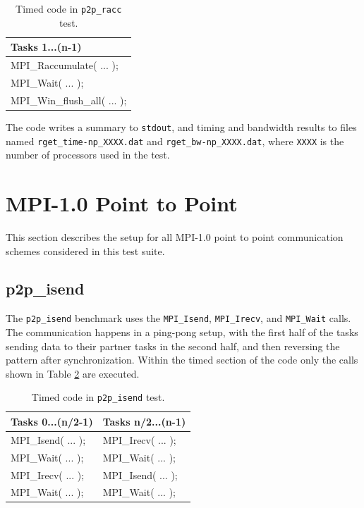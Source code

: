 \documentclass[10pt,a4paper]{report}
\begin{document}
\begin{table}[ht]
\centering
\caption{Timed code in \texttt{p2p\_racc} test.}
\label{tab:racc}
\begin{tabular}{|l|}
\hline
\bf{Tasks 1...(n-1)}	   \\\hline
MPI\_Raccumulate( ... );           \\
MPI\_Wait( ... );           \\
MPI\_Win\_flush\_all( ... );\\\hline
\end{tabular}
\end{table}

The code writes a summary to \verb+stdout+, and timing and bandwidth results to files named \verb+rget_time-np_XXXX.dat+ and \verb+rget_bw-np_XXXX.dat+, where \verb+XXXX+ is the number of processors used in the test.

\section{MPI-1.0 Point to Point}
This section describes the setup for all MPI-1.0 point to point communication schemes considered in this test suite.

\subsection{p2p\_isend}
The \verb+p2p_isend+ benchmark uses the \verb+MPI_Isend+, \verb+MPI_Irecv+, and \verb+MPI_Wait+ calls. The communication happens in a ping-pong setup, with the first half of the tasks sending data to their partner tasks in the second half, and then reversing the pattern after synchronization. Within the timed section of the code only the calls shown in Table \ref{tab:isend} are executed.

\begin{table}[ht]
\centering
\caption{Timed code in \texttt{p2p\_isend} test.}
\label{tab:isend}
\begin{tabular}{|l|l|}
\hline
\bf{Tasks 0...(n/2-1)}	& \bf{Tasks n/2...(n-1)}\\\hline
MPI\_Isend( ... );      & MPI\_Irecv( ... );\\
MPI\_Wait( ... );       & MPI\_Wait( ... );\\
MPI\_Irecv( ... );      & MPI\_Isend( ... );\\
MPI\_Wait( ... );       & MPI\_Wait( ... );\\\hline
\end{tabular}
\end{table}
\end{document}
